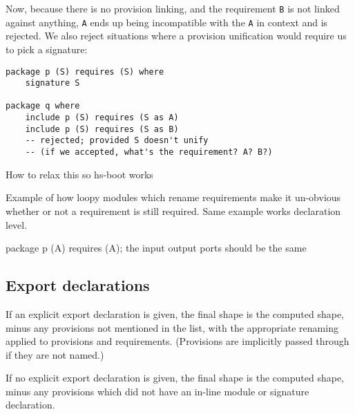\documentclass{article}
\newcommand{\Red}[1]{{\color{red} #1}}
\begin{document}
Now, because there is no provision linking, and the requirement \verb|B| is
not linked against anything, \verb|A| ends up being incompatible with
the \verb|A| in context and is rejected.  We also reject situations where
a provision unification would require us to pick a signature:

\begin{verbatim}
package p (S) requires (S) where
    signature S

package q where
    include p (S) requires (S as A)
    include p (S) requires (S as B)
    -- rejected; provided S doesn't unify
    -- (if we accepted, what's the requirement? A? B?)
\end{verbatim}

\Red{How to relax this so hs-boot works}

\Red{Example of how loopy modules which rename requirements make it un-obvious whether or not
a requirement is still required.  Same example works declaration level.}

\Red{package p (A) requires (A); the input output ports should be the same}

%
%
%

\newpage

\subsection{Export declarations}

If an explicit export declaration is given, the final shape is the
computed shape, minus any provisions not mentioned in the list, with the
appropriate renaming applied to provisions and requirements.  (Provisions
are implicitly passed through if they are not named.)

If no explicit export declaration is given, the final shape is
the computed shape, minus any provisions which did not have an in-line
module or signature declaration.
\end{document}
